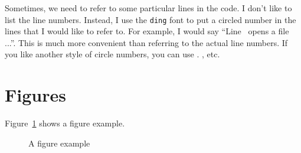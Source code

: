 Sometimes, we need to refer to some particular lines in the code. I don't like to list 
the line numbers. Instead, I use the \texttt{ding} font to 
put a circled number in the lines that I would like to refer to. 
For example, I would say ``Line~ opens a file ...''. 
This is much more convenient than referring to the actual line numbers. 
If you like another style of circle numbers, you can use
. , etc.




\section{Figures}

Figure~\ref{fig:example} shows a figure example. 

\begin{figure}[htb]
\begin{center}
\end{center}
\caption{A figure example}
\label{fig:example}
\end{figure}
 


